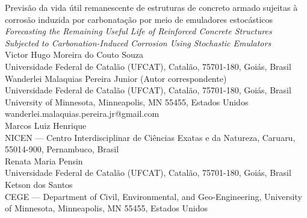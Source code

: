 \begin{center}
{\Huge Previs\~ao da vida \'util remanescente de estruturas de concreto armado sujeitas \`a corros\~ao induzida por carbonata\c{c}\~ao por meio de emuladores estoc\'asticos}
\\[1ex]
{\large\itshape Forecasting the Remaining Useful Life of Reinforced Concrete Structures Subjected to Carbonation-Induced Corrosion Using Stochastic Emulators}
\\[4ex]

{\large Victor Hugo Moreira do Couto Souza} \\
{\small
Universidade Federal de Catal\~ao (UFCAT), Catal\~ao, 75701-180, Goi\'as, Brasil
} \\[1.0em]

{\large Wanderlei Malaquias Pereira Junior \small(Autor correspondente)} \\
{\small
Universidade Federal de Catal\~ao (UFCAT), Catal\~ao, 75701-180, Goi\'as, Brasil \\
University of Minnesota, Minneapolis, MN 55455, Estados Unidos \\
wanderlei.malaquias.pereira.jr@gmail.com
} \\[1.0em]

{\large Marcos Luiz Henrique} \\
{\small
NICEN --- Centro Interdisciplinar de Ci\^encias Exatas e da Natureza, Caruaru, 55014-900, Pernambuco, Brasil
} \\[1.0em]

{\large Renata Maria Pensin} \\
{\small
Universidade Federal de Catal\~ao (UFCAT), Catal\~ao, 75701-180, Goi\'as, Brasil
} \\[1.0em]

{\large Ketson dos Santos} \\
{\small
CEGE --- Department of Civil, Environmental, and Geo-Engineering, University of Minnesota, Minneapolis, MN 55455, Estados Unidos
}
\end{center}

